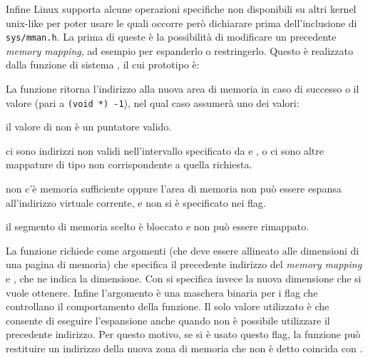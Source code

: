 Infine Linux supporta alcune operazioni specifiche non disponibili su altri
kernel unix-like per poter usare le quali occorre però dichiarare
 prima dell'inclusione di \texttt{sys/mman.h}. La prima
di queste è la possibilità di modificare un precedente \textit{memory
  mapping}, ad esempio per espanderlo o restringerlo.  Questo è realizzato
dalla funzione di sistema , il cui prototipo è:

\begin{funcproto}{
}

{La funzione ritorna l'indirizzo alla nuova area di memoria in caso di
  successo o il valore  (pari a \texttt{(void *) -1}), nel
  qual caso  assumerà uno dei valori:
  \begin{errlist}
    \item[\errcode{EINVAL}] il valore di  non è un
      puntatore valido.
    \item[\errcode{EFAULT}] ci sono indirizzi non validi nell'intervallo
      specificato da  e , o ci sono altre
      mappature di tipo non corrispondente a quella richiesta.
    \item[\errcode{ENOMEM}] non c'è memoria sufficiente oppure l'area di
      memoria non può essere espansa all'indirizzo virtuale corrente, e non si
      è specificato  nei flag.
    \item[\errcode{EAGAIN}] il segmento di memoria scelto è bloccato e non può
      essere rimappato.
  \end{errlist}
}
\end{funcproto}

La funzione richiede come argomenti  (che deve essere
allineato alle dimensioni di una pagina di memoria) che specifica il
precedente indirizzo del \textit{memory mapping} e , che ne
indica la dimensione. Con  si specifica invece la nuova
dimensione che si vuole ottenere. Infine l'argomento  è una
maschera binaria per i flag che controllano il comportamento della funzione.
Il solo valore utilizzato è  che consente di eseguire
l'espansione anche quando non è possibile utilizzare il precedente
indirizzo. Per questo motivo, se si è usato questo flag, la funzione può
restituire un indirizzo della nuova zona di memoria che non è detto coincida
con .

